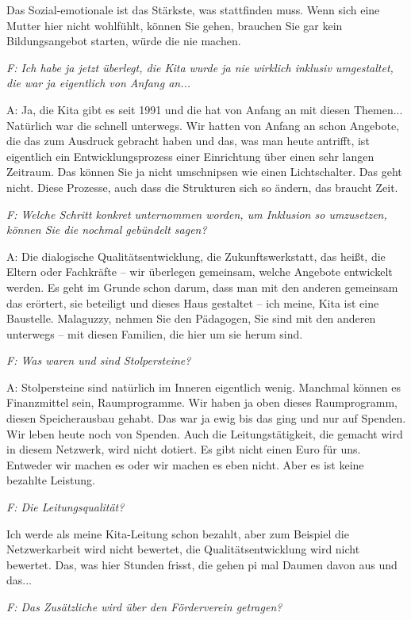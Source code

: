 \begin{linenumbers}
Das Sozial-emotionale ist das Stärkste, was stattfinden muss. Wenn sich eine Mutter hier nicht wohlfühlt, können Sie gehen, brauchen Sie gar kein Bildungsangebot starten, würde die nie machen.  

\emph{F: Ich habe ja jetzt überlegt, die Kita wurde ja nie wirklich inklusiv umgestaltet, die war ja eigentlich von Anfang an...}

A: Ja, die Kita gibt es seit 1991 und die hat von Anfang an mit diesen Themen... Natürlich war die schnell unterwegs. Wir hatten von Anfang an schon Angebote, die das zum Ausdruck gebracht haben und das, was man heute antrifft, ist eigentlich ein Entwicklungsprozess einer Einrichtung über einen sehr langen Zeitraum. Das können Sie ja nicht umschnipsen wie einen Lichtschalter. Das geht nicht. Diese Prozesse, auch dass die Strukturen sich so ändern, das braucht Zeit. 

\emph{F: Welche Schritt konkret unternommen worden, um Inklusion so umzusetzen, können Sie die nochmal gebündelt sagen?}

A: Die dialogische Qualitätsentwicklung, die Zukunftswerkstatt, das heißt, die Eltern oder Fachkräfte -- wir überlegen gemeinsam, welche Angebote entwickelt werden. Es geht im Grunde schon darum, dass man mit den anderen gemeinsam das erörtert, sie beteiligt und dieses Haus gestaltet -- ich meine, Kita ist eine Baustelle. Malaguzzy, nehmen Sie den Pädagogen, Sie sind mit den anderen unterwegs -- mit diesen Familien, die hier um sie herum sind. 

\emph{F: Was waren und sind Stolpersteine?}

A: Stolpersteine sind natürlich im Inneren eigentlich wenig. Manchmal können es Finanzmittel sein, Raumprogramme. Wir haben ja oben dieses Raumprogramm, diesen Speicherausbau gehabt. Das war ja ewig bis das ging und nur auf Spenden. Wir leben heute noch von Spenden. Auch die Leitungstätigkeit, die gemacht wird in diesem Netzwerk, wird nicht dotiert. Es gibt nicht einen Euro für uns. Entweder wir machen es oder wir machen es eben nicht. Aber es ist keine bezahlte Leistung.          

\emph{F: Die Leitungsqualität?}

Ich werde als meine Kita-Leitung schon bezahlt, aber zum Beispiel die Netzwerkarbeit wird nicht bewertet, die Qualitätsentwicklung wird nicht bewertet. Das, was hier Stunden frisst, die gehen pi mal Daumen davon aus und das...

\emph{F: Das Zusätzliche wird über den Förderverein getragen?}


\end{linenumbers}
